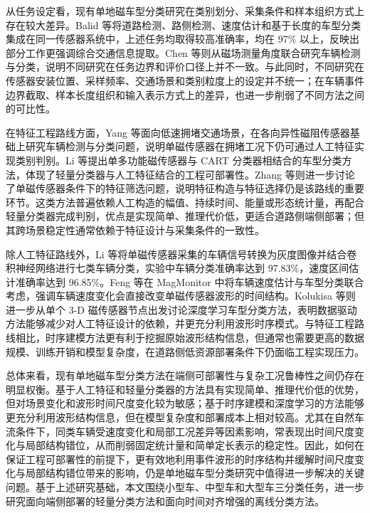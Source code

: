 \documentclass{xdupgthesis}
\begin{document}
从任务设定看，现有单地磁车型分类研究在类别划分、采集条件和样本组织方式上存在较大差异。Balid 等\cite{R18}将道路检测、路侧检测、速度估计和基于长度的车型分类集成在同一传感器系统中，上述任务均取得较高准确率，均在 97\% 以上，反映出部分工作更强调综合交通信息提取。Chen 等\cite{R19}则从磁场测量角度联合研究车辆检测与分类，说明不同研究在任务边界和评价口径上并不一致。与此同时，不同研究在传感器安装位置、采样频率、交通场景和类别粒度上的设定并不统一；在车辆事件边界截取、样本长度组织和输入表示方式上的差异，也进一步削弱了不同方法之间的可比性。

在特征工程路线方面，Yang 等\cite{R20}面向低速拥堵交通场景，在各向异性磁阻传感器基础上研究车辆检测与分类问题，说明单磁传感器在拥堵工况下仍可通过人工特征实现类别判别。Li 等\cite{R23}提出单多功能磁传感器与 CART 分类器相结合的车型分类方法，体现了轻量分类器与人工特征结合的工程可部署性。Zhang 等\cite{ch3_zhang2019featureselection}则进一步讨论了单磁传感器条件下的特征筛选问题，说明特征构造与特征选择仍是该路线的重要环节。这类方法普遍依赖人工构造的幅值、持续时间、能量或形态统计量，再配合轻量分类器完成判别，优点是实现简单、推理代价低，更适合道路侧端侧部署；但其跨场景稳定性通常依赖于特征设计与采集条件的一致性。

除人工特征路线外，Li 等\cite{ch3_li2020singlemag}将单磁传感器采集的车辆信号转换为灰度图像并结合卷积神经网络进行七类车辆分类，实验中车辆分类准确率达到 97.83\%，速度区间估计准确率达到 96.85\%。Feng 等\cite{feng2022magmonitor}在 MagMonitor 中将车辆速度估计与车型分类联合考虑，强调车辆速度变化会直接改变单磁传感器波形的时间结构。Kolukisa 等\cite{R26}则进一步从单个 3-D 磁传感器节点出发讨论深度学习车型分类方法，表明数据驱动方法能够减少对人工特征设计的依赖，并更充分利用波形时序模式。与特征工程路线相比，时序建模方法更有利于挖掘原始波形结构信息，但通常也需要更高的数据规模、训练开销和模型复杂度，在道路侧低资源部署条件下仍面临工程实现压力。

总体来看，现有单地磁车型分类方法在端侧可部署性与复杂工况鲁棒性之间仍存在明显权衡。基于人工特征和轻量分类器的方法具有实现简单、推理代价低的优势，但对场景变化和波形时间尺度变化较为敏感；基于时序建模和深度学习的方法能够更充分利用波形结构信息，但在模型复杂度和部署成本上相对较高。尤其在自然车流条件下，同类车辆受速度变化和局部工况差异等因素影响，常表现出时间尺度变化与局部结构错位，从而削弱固定统计量和简单定长表示的稳定性。因此，如何在保证工程可部署性的前提下，更有效地利用事件波形的时序结构并缓解时间尺度变化与局部结构错位带来的影响，仍是单地磁车型分类研究中值得进一步解决的关键问题。基于上述研究基础，本文围绕小型车、中型车和大型车三分类任务，进一步研究面向端侧部署的轻量分类方法和面向时间对齐增强的离线分类方法。
\end{document}
